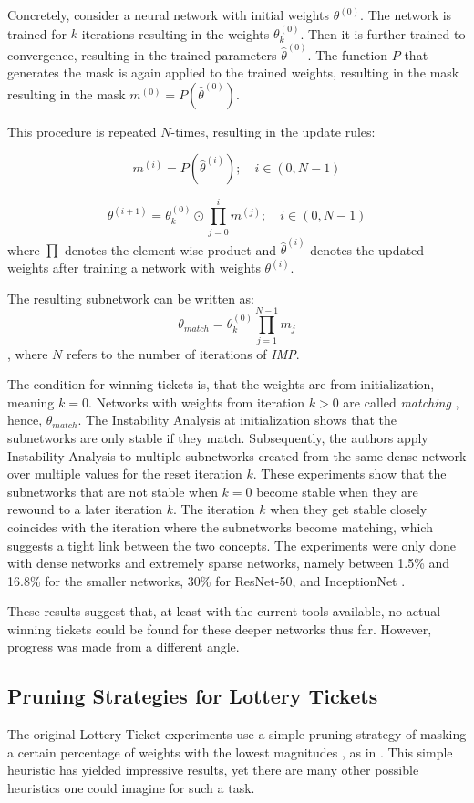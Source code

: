 Concretely, consider a neural network with initial weights $\theta^{(0)}$. The network is trained for $k$-iterations resulting in the weights $\theta_k^{(0)}$. Then it is further trained to convergence, resulting in the trained parameters $\hat \theta^{(0)}$.
The function $P$ that generates the mask is again applied to the trained weights, resulting in the mask resulting in the mask $m^{(0)} = \textit{P}(\hat \theta^{(0)})$.

This procedure is repeated $N$-times, resulting in the update rules:

\[
m^{(i)} = \textit{P}(\hat \theta^{(i)}); \quad i \in (0,N-1)
\]


\[\theta^{(i+1)} = \theta_k^{(0)} \odot \prod_{j=0}^{i}m^{(j)}; \quad i \in (0,N-1)\] where $\prod$ denotes the element-wise product and $\hat \theta^{(i)}$ denotes the updated weights after training a network with weights $\theta^{(i)}$.

The resulting subnetwork can be written as:
\[
\theta_{match} = \theta_{k}^{(0)}\prod_{j=1}^{N-1}m_j
\]
, where $N$ refers to the number of iterations of \textit{IMP}.

The condition for winning tickets is, that the weights are from initialization, meaning $k=0$. 
Networks with weights from iteration $k > 0$ are called \textit{matching} \autocite{LinearModeConnectivity}, hence, $\theta_{match}$.
The Instability Analysis at initialization shows that the subnetworks are only stable if they match.
Subsequently, the authors apply Instability Analysis to multiple subnetworks created from the same dense network over multiple values for the reset iteration $k$.
These experiments show that the subnetworks that are not stable when $k=0$ become stable when they are rewound to a later iteration $k$.
The iteration $k$ when they get stable closely coincides with the iteration where the subnetworks become matching, which suggests a tight link between the two concepts.
The experiments were only done with dense networks and extremely sparse networks, namely between 1.5\% and 16.8\% for the smaller networks, 30\% for ResNet-50, and InceptionNet \autocite{LinearModeConnectivity}.

These results suggest that, at least with the current tools available, no actual winning tickets could be found for these deeper networks thus far.
However, progress was made from a different angle.

\subsection{Pruning Strategies for Lottery Tickets}
The original Lottery Ticket experiments use a simple pruning strategy of masking a certain percentage of weights with the lowest magnitudes \autocite{LTH}, as in \autocite{HanEtAl15}. This simple heuristic has yielded impressive results, yet there are many other possible heuristics one could imagine for such a task.

